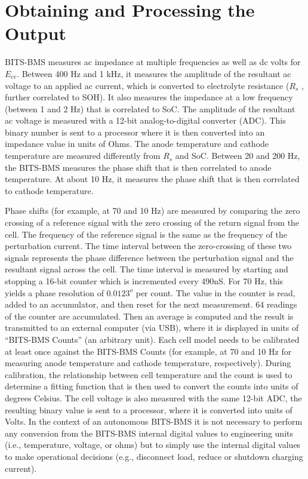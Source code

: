 \section{Obtaining and Processing the Output}

\hspace{0.5cm}
BITS-BMS measures ac impedance at multiple frequencies as well as dc volts for $E_{cv}$. Between 400 Hz and 1 kHz, it measures the amplitude of the resultant ac voltage to an applied ac current, which is converted to electrolyte resistance ($R_s$ , further correlated to SOH). It also measures the impedance at a low frequency (between 1 and 2 Hz) that is correlated to SoC. The amplitude of the resultant ac voltage is measured with a 12-bit analog-to-digital converter (ADC). This binary number is sent to a processor where it is then converted into an impedance value in units of Ohms. The anode temperature and cathode temperature are measured differently from $R_s$ and SoC. Between 20 and 200 Hz, the BITS-BMS measures the phase shift that is then correlated to anode temperature. At about 10 Hz, it measures the phase shift that is then correlated to cathode temperature. 

\vspace{0.5cm}
Phase shifts (for example, at 70 and 10 Hz) are measured by comparing the zero crossing of a reference signal with the zero crossing of the return signal from the cell. The frequency of the reference signal is the same as the frequency of the perturbation current. The time interval between the zero-crossing of these two signals represents the phase difference between the perturbation signal and the resultant signal across the cell. The time interval is measured by starting and stopping a 16-bit counter which is incremented every 490nS. For 70 Hz, this yields a phase resolution of $0.0123^o$ per count. The value in the counter is read, added to an accumulator, and then reset for the next measurement. 64 readings of the counter are accumulated. Then an average is computed and the result is transmitted to an external computer (via USB), where it is displayed in units of “BITS-BMS Counts” (an arbitrary unit). Each cell model needs to be calibrated at least once against the BITS-BMS Counts (for example, at 70 and 10 Hz for measuring anode temperature and cathode temperature, respectively). During calibration, the relationship between cell temperature and the count is used to determine a fitting function that is then used to convert the counts into units of degrees Celsius. The cell voltage is also measured with the same 12-bit ADC, the resulting binary value is sent to a processor, where it is converted into units of Volts. In the context of an autonomous BITS-BMS it is not necessary to perform any conversion from the BITS-BMS internal digital values to engineering units (i.e., temperature, voltage, or ohms) but to simply use the internal digital values to make operational decisions (e.g., disconnect load, reduce or shutdown charging current).

